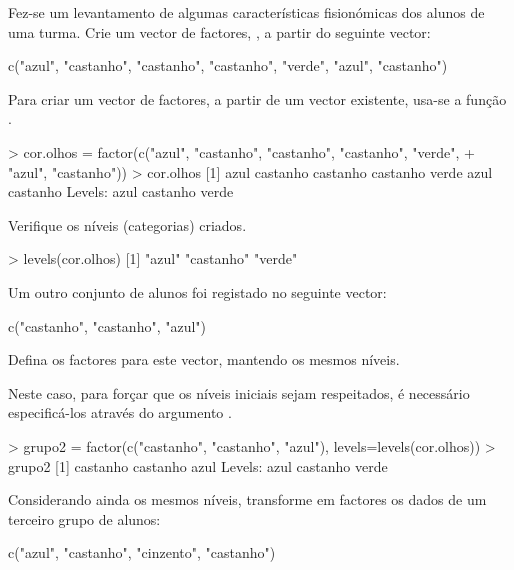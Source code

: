\documentclass{exam}
\begin{document}
\begin{questions}
	
\question Fez-se um levantamento de algumas características fisionómicas dos alunos de uma turma. Crie um vector de factores, , a partir do seguinte vector:

\begin{rcode}
	c("azul", "castanho", "castanho", "castanho", "verde", "azul", "castanho")
\end{rcode}

\begin{solution}
	Para criar um vector de factores, a partir de um vector existente, usa-se a função .
		\begin{rcode}
			> cor.olhos = factor(c("azul", "castanho", "castanho", "castanho", "verde",
			+ "azul", "castanho"))
			> cor.olhos
			[1] azul     castanho castanho castanho verde    azul     castanho
			Levels: azul castanho verde
		\end{rcode}
\end{solution}

\question Verifique os níveis (categorias) criados.
\begin{solution}
	
	\begin{rcode}
		> levels(cor.olhos)
		[1] "azul"     "castanho" "verde"   
	\end{rcode}
\end{solution}

\question Um outro conjunto de alunos foi registado no seguinte vector:
\begin{rcode}
	c("castanho", "castanho", "azul")
\end{rcode}
Defina os factores para este vector, mantendo os mesmos níveis.

\begin{solution}
	Neste caso, para forçar que os níveis iniciais sejam respeitados, é necessário especificá-los através do argumento .
	\begin{rcode}
		> grupo2 = factor(c("castanho", "castanho", "azul"), levels=levels(cor.olhos))
		> grupo2
		[1] castanho castanho azul
		Levels: azul castanho verde
	\end{rcode}
\end{solution}

\question Considerando ainda os mesmos níveis, transforme em factores os dados de um terceiro grupo de alunos:

\begin{rcode}
	c("azul", "castanho", "cinzento", "castanho")
\end{rcode}


\end{questions}
\end{document}
